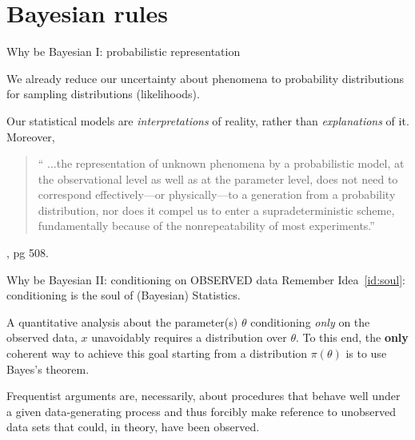 \section*{Bayesian rules}
\begin{frame}{Why be Bayesian I: probabilistic representation}

We already reduce our uncertainty about phenomena to probability distributions for sampling distributions (likelihoods).

\begin{idea}
 \label{id:prob_uncertainty}
 Our statistical models are \textit{interpretations} of reality, rather than \textit{explanations} of it.
 Moreover,
 \begin{quote}
 `` ...the representation of unknown phenomena by a probabilistic model,  at the observational level as well as at the parameter level, does not need to correspond effectively—or physically—to a generation from a probability distribution, nor does it compel us to enter a supradeterministic scheme, fundamentally because of the nonrepeatability of most experiments.''
 \end{quote}
 \cite{Robert2007}, pg 508.
\end{idea}
 \end{frame}
\begin{frame}{Why be Bayesian II: conditioning on OBSERVED data}
  Remember Idea~\ref{id:soul}: conditioning is the soul of (Bayesian) Statistics.
  \begin{idea}
   \label{id:obs_data}
   A quantitative analysis about the parameter(s) $\theta$ conditioning \textit{only} on the observed data, $x$ unavoidably requires a distribution over $\theta$.
   To this end, the \textbf{only} coherent way to achieve this goal starting from a distribution $\pi(\theta)$ is to use Bayes's theorem.
  \end{idea}
  
  Frequentist arguments are, necessarily, about procedures that behave well under a given data-generating process and thus forcibly make reference to unobserved data sets that could, in theory, have been observed.
 \end{frame}
